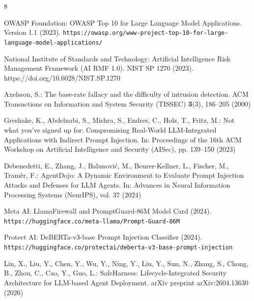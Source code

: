 \documentclass[runningheads]{llncs}
\begin{document}
\begin{thebibliography}{8}
\providecommand{\url}[1]{\texttt{#1}}
\providecommand{\urlprefix}{URL }
\providecommand{\doi}[1]{https://doi.org/#1}

OWASP Foundation: OWASP Top 10 for Large Language Model Applications. Version 1.1 (2023). \url{https://owasp.org/www-project-top-10-for-large-language-model-applications/}

National Institute of Standards and Technology: Artificial Intelligence Risk Management Framework (AI RMF 1.0). NIST SP 1270 (2023). \doi{10.6028/NIST.SP.1270}

Axelsson, S.: The base-rate fallacy and the difficulty of intrusion detection. ACM Transactions on Information and System Security (TISSEC) \textbf{3}(3), 186--205 (2000)

Greshake, K., Abdelnabi, S., Mishra, S., Endres, C., Holz, T., Fritz, M.: Not what you've signed up for: Compromising Real-World LLM-Integrated Applications with Indirect Prompt Injection. In: Proceedings of the 16th ACM Workshop on Artificial Intelligence and Security (AISec), pp. 139--150 (2023)

Debenedetti, E., Zhang, J., Balunovi{\'c}, M., Beurer-Kellner, L., Fischer, M., Tram{\`e}r, F.: AgentDojo: A Dynamic Environment to Evaluate Prompt Injection Attacks and Defenses for LLM Agents. In: Advances in Neural Information Processing Systems (NeurIPS), vol. 37 (2024)

Meta AI: LlamaFirewall and PromptGuard-86M Model Card (2024). \url{https://huggingface.co/meta-llama/Prompt-Guard-86M}

Protect AI: DeBERTa-v3-base Prompt Injection Classifier (2024). \url{https://huggingface.co/protectai/deberta-v3-base-prompt-injection}

Lin, X., Liu, Y., Chen, Y., Wu, Y., Ning, Y., Liu, Y., Sun, N., Zhang, S., Chong, B., Zhou, C., Cao, Y., Guo, L.: SafeHarness: Lifecycle-Integrated Security Architecture for LLM-based Agent Deployment. arXiv preprint arXiv:2604.13630 (2026)

\end{thebibliography}
\end{document}
